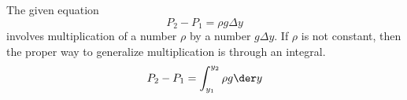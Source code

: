 The given equation
\begin{equation*}
  P_2-P_1 = \rho g \Delta y
\end{equation*}
involves multiplication of a number $\rho$ by a number $g\Delta y$. If $\rho$ is not constant,
then the proper way to generalize multiplication is through an integral.
\begin{equation*}
  P_2-P_1 = \int_{y_1}^{y_2} \rho g \der y
\end{equation*}
